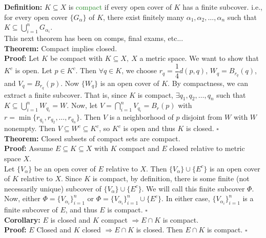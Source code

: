 \documentclass{article}
\begin{document}
\textbf{Definition:} $K \subseteq X$ is \textcolor{ForestGreen}{compact} if every open cover of $K$ has a finite subcover. i.e., for every open cover $\{G_{\alpha}\}$ of $K$, there exist finitely many $\alpha_1, \alpha_2, \dots, \alpha_n$ such that $K \subseteq \bigcup_{i = 1}^n G_{\alpha_i}$.\\

This next theorem has been on comps, final exams, etc...\\

\textbf{Theorem:} Compact implies closed.\\
\textbf{Proof:} Let $K$ be compact with $K \subseteq X, \ X$ a metric space. We want to show that $K^c$ is open. Let $p \in K^c$. Then $\forall q \in K$, we choose $r_q = \dfrac{1}{4}d(p,q)$, $W_{q} = B_{r_q}(q)$, and $V_q = B_{r_q}(p)$. Now $\{W_q\}$ is an open cover of $K$. By compactness, we can extract a finite subcover. That is, since $K$ is compact, $\exists q_1, q_2, \dots, q_n$ such that $K \subseteq \bigcup_{i = 1}^n W_{q_i} = W$. Now, let $V = \bigcap_{i = 1}^nV_{q_i} = B_r(p)$ with $r = \min{\{r_{q_1}, r_{q_2}, \dots, r_{q_n}\}}$. Then $V$ is a neighborhood of $p$ disjoint from $W$ with $W$ nonempty. Then $V \subseteq W^c \subseteq K^c$, so $K^c$ is open and thus $K$ is closed. $\square$\\

\textbf{Theorem:} Closed subsets of compact sets are compact. \\

\textbf{Proof:} Assume $E \subseteq K \subseteq X$ with $K$ compact and $E$ closed relative to metric space $X$. \\

Let $\{V_{\alpha}\}$ be an open cover of $E$ relative to $X$. Then $\{V_{\alpha}\} \cup \{E^c\}$ is an open cover of $K$ relative to $X$. Since $K$ is compact, by definition, there is some finite (not necessarily unique) subcover of $\{V_{\alpha}\} \cup \{E^c\}$. We will call this finite subcover $\Phi$. \\

Now, either $\Phi = \{V_{\alpha_i}\}_{i = 1}^n$ or $\Phi = \{V_{\alpha_i}\}_{i = 1}^n \cup \{E^c\}$. In either case, $\{V_{\alpha_i}\}_{i = 1}^n$ is a finite subcover of $E$, and thus $E$ is compact. $\square$\\

\textbf{Corollary:} $E$ is closed and $K$ compact $\Longrightarrow E \cap K$ is compact.\\

\textbf{Proof:} $E$ Closed and $K$ closed $\Longrightarrow E \cap K$ is closed. Then $E \cap K$ is compact. $\square$\\
\end{document}
